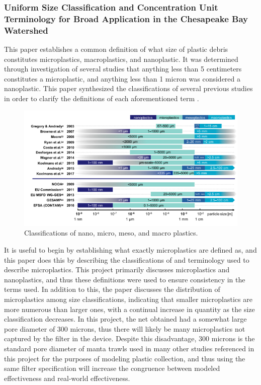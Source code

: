 \documentclass[fleqn,10pt]{SelfArx} %
\begin{document}
	\subsubsection*{Uniform Size Classification and Concentration Unit Terminology for Broad Application in the Chesapeake Bay Watershed
	}
	This paper establishes a common definition of what size of plastic debris constitutes microplastics, macroplastics, and nanoplastic. It was determined through investigation of several studies  that anything less than 5 centimeters constitutes a microplastic, and anything less than 1 micron was considered a nanoplastic. This paper synthesized the classifications of several previous studies in order to clarify the definitions of each aforementioned term \cite{TetraTech}.
	\begin{figure}[h]
		\centering
		\includegraphics[width=\linewidth]{Figures/TetraTech.png}
		\caption[MP Size Classes]{Classifications of nano, micro, meso, and macro plastics.}
		\label{fig:TetraTech}
	\end{figure}
	It is useful to begin by establishing what exactly microplastics are defined as, and this paper does this by describing the classifications of and terminology used to describe microplastics. This project primarily discusses microplastics and nanoplastics, and thus these definitions were used to ensure consistency in the terms used. In addition to this, the paper discusses the distribution of microplastics among size classifications, indicating that smaller microplastics are more numerous than larger ones, with a continual increase in quantity as the size classification decreases. In this project, the net obtained had a somewhat large pore diameter of 300 microns, thus there will likely be many microplastics not captured by the filter in the device. Despite this disadvantage, 300 microns is the standard pore diameter of manta trawls used in many other studies referenced in this project for the purposes of modeling plastic collection, and thus using the same filter specification will increase the congruence between modeled effectiveness and real-world effectiveness.
\end{document}
